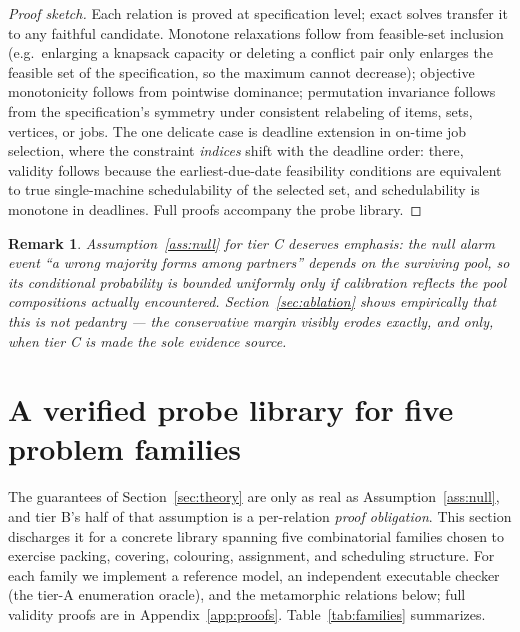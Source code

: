 \documentclass[pdflatex,sn-mathphys-num]{sn-jnl}
\theoremstyle{thmstyleone}
\theoremstyle{thmstyletwo}
\newtheorem{remark}{Remark}
\begin{document}
\begin{proof}[Proof sketch]
Each relation is proved at specification level; exact solves transfer
it to any faithful candidate. Monotone relaxations follow from
feasible-set inclusion (e.g.\ enlarging a knapsack capacity or
deleting a conflict pair only enlarges the feasible set of the
specification, so the maximum cannot decrease); objective
monotonicity follows from pointwise dominance; permutation invariance
follows from the specification's symmetry under consistent relabeling
of items, sets, vertices, or jobs. The one delicate case is deadline
extension in on-time job selection, where the constraint
\emph{indices} shift with the deadline order: there, validity follows
because the earliest-due-date feasibility conditions are equivalent
to true single-machine schedulability of the selected set, and
schedulability is monotone in deadlines. Full proofs accompany the
probe library.
\end{proof}

\begin{remark}
Assumption~\ref{ass:null} for tier C deserves emphasis: the null
alarm event ``a wrong majority forms among partners'' depends on the
surviving pool, so its conditional probability is bounded uniformly
only if calibration reflects the pool compositions actually
encountered. Section~\ref{sec:ablation} shows empirically that this
is not pedantry --- the conservative margin visibly erodes exactly,
and only, when tier C is made the sole evidence source.
\end{remark}

\section{A verified probe library for five problem families}
\label{sec:library}

The guarantees of Section~\ref{sec:theory} are only as real as
Assumption~\ref{ass:null}, and tier B's half of that assumption is a
per-relation \emph{proof obligation}. This section discharges it for
a concrete library spanning five combinatorial families chosen to
exercise packing, covering, colouring, assignment, and scheduling
structure. For each family we implement a reference model, an
independent executable checker (the tier-A enumeration oracle), and
the metamorphic relations below; full validity proofs are in
Appendix~\ref{app:proofs}. Table~\ref{tab:families} summarizes.
\end{document}

